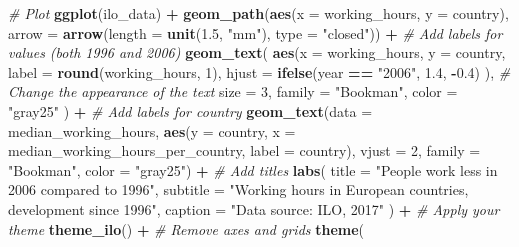 \documentclass[]{article}
\newenvironment{Shaded}{\begin{snugshade}}{\end{snugshade}}
\newcommand{\KeywordTok}[1]{\textcolor[rgb]{0.13,0.29,0.53}{\textbf{#1}}}
\newcommand{\DataTypeTok}[1]{\textcolor[rgb]{0.13,0.29,0.53}{#1}}
\newcommand{\DecValTok}[1]{\textcolor[rgb]{0.00,0.00,0.81}{#1}}
\newcommand{\FloatTok}[1]{\textcolor[rgb]{0.00,0.00,0.81}{#1}}
\newcommand{\StringTok}[1]{\textcolor[rgb]{0.31,0.60,0.02}{#1}}
\newcommand{\CommentTok}[1]{\textcolor[rgb]{0.56,0.35,0.01}{\textit{#1}}}
\newcommand{\OperatorTok}[1]{\textcolor[rgb]{0.81,0.36,0.00}{\textbf{#1}}}
\newcommand{\NormalTok}[1]{#1}
\begin{document}
\begin{Shaded}
\begin{Highlighting}[]
\CommentTok{# Plot}
\KeywordTok{ggplot}\NormalTok{(ilo_data) }\OperatorTok{+}
\StringTok{  }\KeywordTok{geom_path}\NormalTok{(}\KeywordTok{aes}\NormalTok{(}\DataTypeTok{x =}\NormalTok{ working_hours, }\DataTypeTok{y =}\NormalTok{ country),}
            \DataTypeTok{arrow =} \KeywordTok{arrow}\NormalTok{(}\DataTypeTok{length =} \KeywordTok{unit}\NormalTok{(}\FloatTok{1.5}\NormalTok{, }\StringTok{"mm"}\NormalTok{), }\DataTypeTok{type =} \StringTok{"closed"}\NormalTok{)) }\OperatorTok{+}
\StringTok{  }\CommentTok{# Add labels for values (both 1996 and 2006)}
\StringTok{  }\KeywordTok{geom_text}\NormalTok{(}
        \KeywordTok{aes}\NormalTok{(}\DataTypeTok{x =}\NormalTok{ working_hours,}
            \DataTypeTok{y =}\NormalTok{ country,}
            \DataTypeTok{label =} \KeywordTok{round}\NormalTok{(working_hours, }\DecValTok{1}\NormalTok{),}
            \DataTypeTok{hjust =} \KeywordTok{ifelse}\NormalTok{(year }\OperatorTok{==}\StringTok{ "2006"}\NormalTok{, }\FloatTok{1.4}\NormalTok{, }\OperatorTok{-}\FloatTok{0.4}\NormalTok{)}
\NormalTok{          ),}
        \CommentTok{# Change the appearance of the text}
        \DataTypeTok{size =} \DecValTok{3}\NormalTok{,}
        \DataTypeTok{family =} \StringTok{"Bookman"}\NormalTok{,}
        \DataTypeTok{color =} \StringTok{"gray25"}
\NormalTok{   ) }\OperatorTok{+}
\StringTok{  }\CommentTok{# Add labels for country}
\StringTok{  }\KeywordTok{geom_text}\NormalTok{(}\DataTypeTok{data =}\NormalTok{ median_working_hours,}
            \KeywordTok{aes}\NormalTok{(}\DataTypeTok{y =}\NormalTok{ country,}
                \DataTypeTok{x =}\NormalTok{ median_working_hours_per_country,}
                \DataTypeTok{label =}\NormalTok{ country),}
            \DataTypeTok{vjust =} \DecValTok{2}\NormalTok{,}
            \DataTypeTok{family =} \StringTok{"Bookman"}\NormalTok{,}
            \DataTypeTok{color =} \StringTok{"gray25"}\NormalTok{) }\OperatorTok{+}
\StringTok{  }\CommentTok{# Add titles}
\StringTok{  }\KeywordTok{labs}\NormalTok{(}
    \DataTypeTok{title =} \StringTok{"People work less in 2006 compared to 1996"}\NormalTok{,}
    \DataTypeTok{subtitle =} \StringTok{"Working hours in European countries, development since 1996"}\NormalTok{,}
    \DataTypeTok{caption =} \StringTok{"Data source: ILO, 2017"}
\NormalTok{  ) }\OperatorTok{+}
\StringTok{  }\CommentTok{# Apply your theme }
\StringTok{  }\KeywordTok{theme_ilo}\NormalTok{() }\OperatorTok{+}
\StringTok{  }\CommentTok{# Remove axes and grids}
\StringTok{  }\KeywordTok{theme}\NormalTok{(}

\end{Highlighting}
\end{Shaded}
\end{document}
